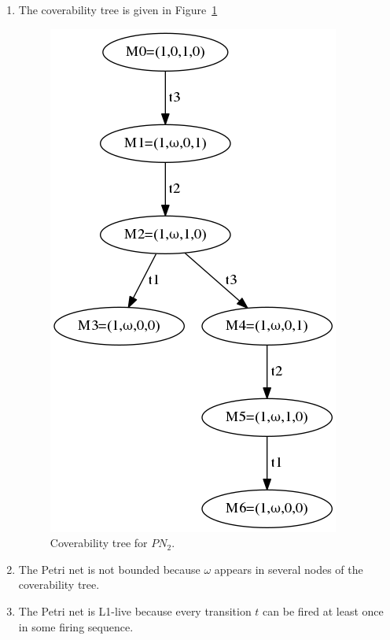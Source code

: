 \documentclass{bsu-ms}
\begin{document}
\begin{enumerate}
\begin{enumerate}[label=(\alph*)]
		\item The coverability tree is given in
		Figure~\ref{fig:pn2cov}
		\begin{figure}[ht]
			\begin{center}
				\includegraphics[scale=.6,keepaspectratio]{pn2cov}
			\end{center}
			\caption{Coverability tree for $PN_2$.}
			\label{fig:pn2cov}
		\end{figure}
		
		\item The Petri net is not bounded because $\omega$
		appears in several nodes of the coverability tree.
		
		\item The Petri net is L1-live because every transition $t$
		can be fired at least once in some firing sequence.
	\end{enumerate}
\end{enumerate}
\end{document}
